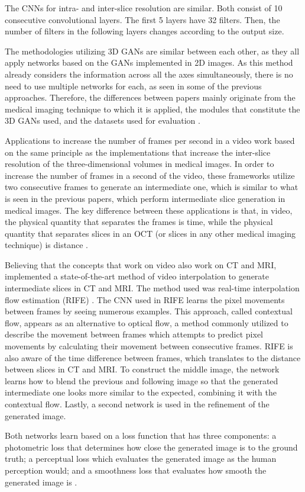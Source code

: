 \par
The CNNs for intra- and inter-slice resolution are similar. Both consist of 10 consecutive convolutional layers. The first 5 layers have 32 filters. Then, the number of filters in the following layers changes according to the output size.
\par
The methodologies utilizing 3D GANs are similar between each other, as they all apply networks based on the GANs implemented in 2D images. As this method already considers the information across all the axes simultaneously, there is no need to use multiple networks for each, as seen in some of the previous approaches. Therefore, the differences between papers mainly originate from the medical imaging technique to which it is applied, the modules that constitute the 3D GANs used, and the datasets used for evaluation \parencite{YChen2018, Sanchez2018, Kudo2019, Zhang2022}.
\par
Applications to increase the number of frames per second in a video work based on the same principle as the implementations that increase the inter-slice resolution of the three-dimensional volumes in medical images. In order to increase the number of frames in a second of the video, these frameworks utilize two consecutive frames to generate an intermediate one, which is similar to what is seen in the previous papers, which perform intermediate slice generation in medical images. The key difference between these applications is that, in video, the physical quantity that separates the frames is time, while the physical quantity that separates slices in an OCT (or slices in any other medical imaging technique) is distance \parencite{Fang2022, Gambini2024}.
\par
Believing that the concepts that work on video also work on CT and MRI, \textcite{Gambini2024} implemented a state-of-the-art method of video interpolation to generate intermediate slices in CT and MRI. The method used was real-time interpolation flow estimation (RIFE) \parencite{Huang2022}. The CNN used in RIFE learns the pixel movements between frames by seeing numerous examples. This approach, called contextual flow, appears as an alternative to optical flow, a method commonly utilized to describe the movement between frames which attempts to predict pixel movements by calculating their movement between consecutive frames. RIFE is also aware of the time difference between frames, which translates to the distance between slices in CT and MRI. To construct the middle image, the network learns how to blend the previous and following image so that the generated intermediate one looks more similar to the expected, combining it with the contextual flow. Lastly, a second network is used in the refinement of the generated image.
\par
Both networks learn based on a loss function that has three components: a photometric loss that determines how close the generated image is to the ground truth; a perceptual loss which evaluates the generated image as the human perception would; and a smoothness loss that evaluates how smooth the generated image is \parencite{Huang2022}.

